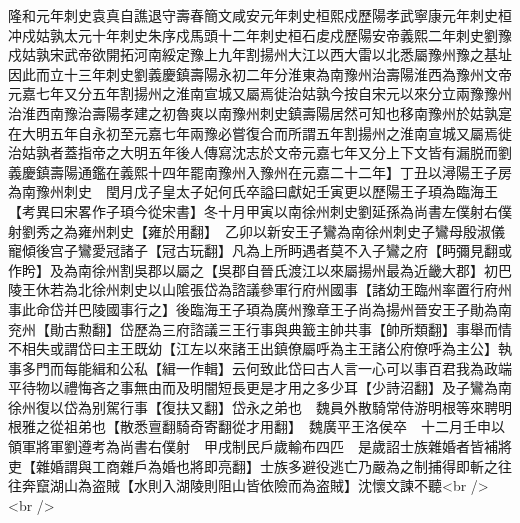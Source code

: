 隆和元年刺史袁真自譙退守壽春簡文咸安元年刺史桓熙戍歷陽孝武寧康元年刺史桓冲戍姑孰太元十年刺史朱序戍馬頭十二年刺史桓石䖍戍歷陽安帝義熙二年刺史劉豫戍姑孰宋武帝欲開拓河南綏定豫上九年割揚州大江以西大雷以北悉屬豫州豫之基址因此而立十三年刺史劉義慶鎮壽陽永初二年分淮東為南豫州治壽陽淮西為豫州文帝元嘉七年又分五年割揚州之淮南宣城又屬焉徙治姑孰今按自宋元以來分立兩豫豫州治淮西南豫治壽陽孝建之初魯爽以南豫州刺史鎮壽陽居然可知也移南豫州於姑孰寔在大明五年自永初至元嘉七年兩豫必嘗復合而所謂五年割揚州之淮南宣城又屬焉徙治姑孰者蓋指帝之大明五年後人傳寫沈志於文帝元嘉七年又分上下文皆有漏脱而劉義慶鎮壽陽通鑑在義熙十四年罷南豫州入豫州在元嘉二十二年】丁丑以潯陽王子房為南豫州刺史　閏月戊子皇太子妃何氏卒謚曰獻妃壬寅更以歷陽王子頊為臨海王　【考異曰宋畧作子頊今從宋書】冬十月甲寅以南徐州刺史劉延孫為尚書左僕射右僕射劉秀之為雍州刺史【雍於用翻】　乙卯以新安王子鸞為南徐州刺史子鸞母殷淑儀寵傾後宫子鸞愛冠諸子【冠古玩翻】凡為上所眄遇者莫不入子鸞之府【眄彌見翻或作盻】及為南徐州割吳郡以屬之【吳郡自晉氏渡江以來屬揚州最為近畿大郡】初巴陵王休若為北徐州刺史以山隂張岱為諮議參軍行府州國事【諸幼王臨州率置行府州事此命岱并巴陵國事行之】後臨海王子頊為廣州豫章王子尚為揚州晉安王子勛為南兖州【勛古勲翻】岱歷為三府諮議三王行事與典籖主帥共事【帥所類翻】事舉而情不相失或謂岱曰主王既幼【江左以來諸王出鎮僚屬呼為主王諸公府僚呼為主公】執事多門而每能緝和公私【緝一作輯】云何致此岱曰古人言一心可以事百君我為政端平待物以禮悔吝之事無由而及明闇短長更是才用之多少耳【少詩沼翻】及子鸞為南徐州復以岱為别駕行事【復扶又翻】岱永之弟也　魏員外散騎常侍游明根等來聘明根雅之從祖弟也【散悉亶翻騎奇寄翻從才用翻】　魏廣平王洛侯卒　十二月壬申以領軍將軍劉遵考為尚書右僕射　甲戌制民戶歲輸布四匹　是歲詔士族雜婚者皆補將吏【雜婚謂與工商雜戶為婚也將即亮翻】士族多避役逃亡乃嚴為之制捕得即斬之往往奔竄湖山為盗賊【水則入湖陵則阻山皆依險而為盗賊】沈懷文諫不聽<br />
<br />
